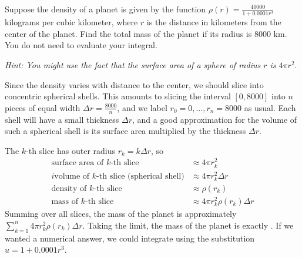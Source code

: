 \documentclass[main]{subfiles}
\begin{document}
\begin{enumerate}
  
  \begin{problem}[2.8in]
    Suppose the density of a planet is given by the function
    $\displaystyle \rho(r) = \frac{40000}{1 + 0.0001r^3}$ kilograms per
    cubic kilometer, where $r$ is the distance in kilometers from the
    center of the planet. Find the total mass of the planet if its radius
    is $8000$ km. You do not need to evaluate your integral. 
    
    \textit{Hint: You might use the fact that the surface area of a sphere of radius $r$ is $4\pi r^2$}. 
  \end{problem}

  \begin{solution}
    Since the density varies with distance to the center, we should slice
    into concentric spherical shells.  This amounts to slicing the
    interval $[0, 8000]$ into $n$ pieces of equal width $\Delta r=\frac{8000}{n}$, and we
    label $r_0 = 0, \ldots, r_n = 8000$ as usual.  Each shell will have a
    small thickness $\Delta r$, and a good approximation for the volume of
    such a spherical shell is its surface area multiplied by the thickness
    $\Delta r$.

    The $k$-th slice has outer radius $r_k=k\Delta r$, so
    \begin{align*}
      \textrm{surface area of $k$-th slice} & \approx 4 \pi r_k^2 \\
 i     \textrm{volume of $k$-th slice (spherical shell)} & \approx 4 \pi
      r_k^2 \Delta r \\
      \textrm{density of $k$-th slice} & \approx \rho(r_k) \\
      \textrm{mass of $k$-th slice} & \approx 4 \pi r_k^2 \rho(r_k) \Delta
      r
    \end{align*}
    Summing over all slices, the mass of the planet is approximately
    $\displaystyle \sum_{k=1}^n 4 \pi r_k^2 \rho(r_k) \Delta r$.  Taking
    the limit, the mass of the planet is exactly .  If we wanted a numerical
    answer, we could integrate using the substitution $u = 1 + 0.0001r^3$.
  \end{solution}
\pspace{\newpage}


\end{enumerate}
\end{document}
